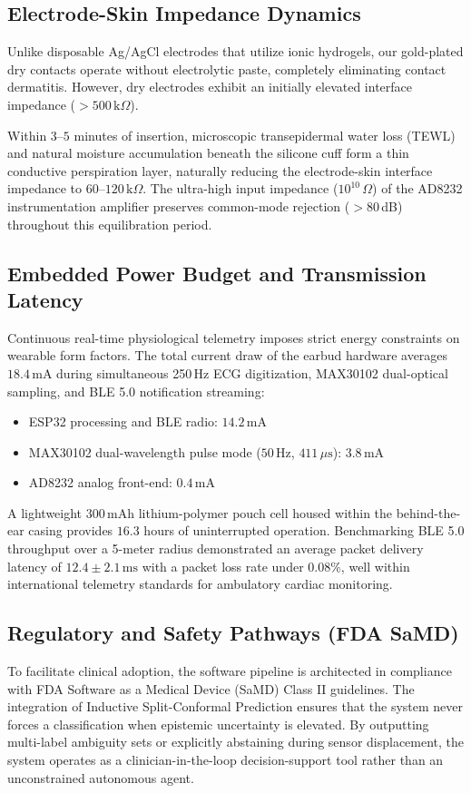 \subsection{Electrode-Skin Impedance Dynamics}
Unlike disposable Ag/AgCl electrodes that utilize ionic hydrogels, our gold-plated dry contacts operate without electrolytic paste, completely eliminating contact dermatitis. However, dry electrodes exhibit an initially elevated interface impedance ($> 500\,\text{k}\Omega$). 

Within $3$--$5$ minutes of insertion, microscopic transepidermal water loss (TEWL) and natural moisture accumulation beneath the silicone cuff form a thin conductive perspiration layer, naturally reducing the electrode-skin interface impedance to $60$--$120\,\text{k}\Omega$. The ultra-high input impedance ($10^{10}\,\Omega$) of the AD8232 instrumentation amplifier preserves common-mode rejection ($> 80$\,dB) throughout this equilibration period.

\subsection{Embedded Power Budget and Transmission Latency}
Continuous real-time physiological telemetry imposes strict energy constraints on wearable form factors. The total current draw of the earbud hardware averages $18.4\,\text{mA}$ during simultaneous 250\,Hz ECG digitization, MAX30102 dual-optical sampling, and BLE 5.0 notification streaming:
\begin{itemize}
    \item ESP32 processing and BLE radio: $14.2\,\text{mA}$
    \item MAX30102 dual-wavelength pulse mode ($50$\,Hz, $411\,\mu\text{s}$): $3.8\,\text{mA}$
    \item AD8232 analog front-end: $0.4\,\text{mA}$
\end{itemize}
A lightweight $300\,\text{mAh}$ lithium-polymer pouch cell housed within the behind-the-ear casing provides $16.3$ hours of uninterrupted operation. Benchmarking BLE 5.0 throughput over a 5-meter radius demonstrated an average packet delivery latency of $12.4 \pm 2.1\,\text{ms}$ with a packet loss rate under $0.08\%$, well within international telemetry standards for ambulatory cardiac monitoring.

\subsection{Regulatory and Safety Pathways (FDA SaMD)}
To facilitate clinical adoption, the software pipeline is architected in compliance with FDA Software as a Medical Device (SaMD) Class II guidelines. The integration of Inductive Split-Conformal Prediction ensures that the system never forces a classification when epistemic uncertainty is elevated. By outputting multi-label ambiguity sets or explicitly abstaining during sensor displacement, the system operates as a clinician-in-the-loop decision-support tool rather than an unconstrained autonomous agent.
